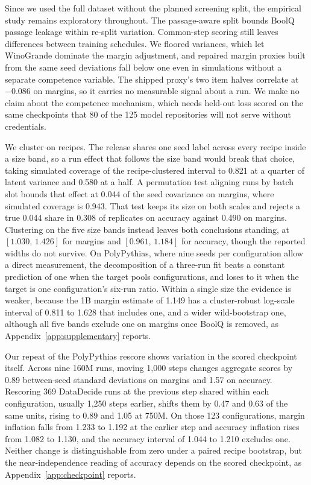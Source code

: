 \documentclass{article}
\newcommand{\ci}[2]{\ensuremath{[#1,\,#2]}}
\begin{document}
Since we used the full dataset without the planned screening split, the empirical study remains exploratory throughout. The passage-aware split bounds BoolQ passage leakage within re-split variation. Common-step scoring still leaves differences between training schedules. We floored variances, which let WinoGrande dominate the margin adjustment, and repaired margin proxies built from the same seed deviations fall below one even in simulations without a separate competence variable. The shipped proxy's two item halves correlate at $-0.086$ on margins, so it carries no measurable signal about a run. We make no claim about the competence mechanism, which needs held-out loss scored on the same checkpoints that 80 of the 125 model repositories will not serve without credentials.

We cluster on recipes. The release shares one seed label across every recipe inside a size band, so a run effect that follows the size band would break that choice, taking simulated coverage of the recipe-clustered interval to 0.821 at a quarter of latent variance and 0.580 at a half. A permutation test aligning runs by batch slot bounds that effect at 0.044 of the seed covariance on margins, where simulated coverage is 0.943. That test keeps its size on both scales and rejects a true 0.044 share in 0.308 of replicates on accuracy against 0.490 on margins. Clustering on the five size bands instead leaves both conclusions standing, at \ci{1.030}{1.426} for margins and \ci{0.961}{1.184} for accuracy, though the reported widths do not survive. On PolyPythias, where nine seeds per configuration allow a direct measurement, the decomposition of a three-run fit beats a constant prediction of one when the target pools configurations, and loses to it when the target is one configuration's six-run ratio. Within a single size the evidence is weaker, because the 1B margin estimate of 1.149 has a cluster-robust log-scale interval of 0.811 to 1.628 that includes one, and a wider wild-bootstrap one, although all five bands exclude one on margins once BoolQ is removed, as Appendix~\ref{app:supplementary} reports.

Our repeat of the PolyPythias rescore shows variation in the scored checkpoint itself. Across nine 160M runs, moving 1,000 steps changes aggregate scores by 0.89 between-seed standard deviations on margins and 1.57 on accuracy. Rescoring 369 DataDecide runs at the previous step shared within each configuration, usually 1,250 steps earlier, shifts them by 0.47 and 0.63 of the same units, rising to 0.89 and 1.05 at 750M. On those 123 configurations, margin inflation falls from 1.233 to 1.192 at the earlier step and accuracy inflation rises from 1.082 to 1.130, and the accuracy interval of 1.044 to 1.210 excludes one. Neither change is distinguishable from zero under a paired recipe bootstrap, but the near-independence reading of accuracy depends on the scored checkpoint, as Appendix~\ref{app:checkpoint} reports.
\end{document}
